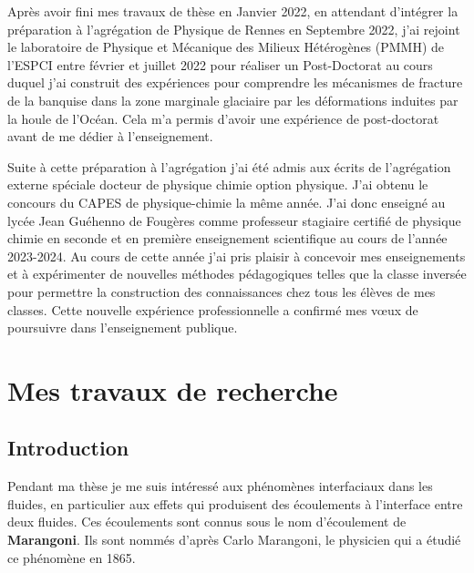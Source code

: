 \documentclass[french, 10pt]{article}
\begin{document}
Après avoir fini mes travaux de thèse en Janvier 2022, en attendant d'intégrer la préparation à l'agrégation de Physique de Rennes en Septembre 2022, j'ai rejoint le laboratoire de Physique et Mécanique des Milieux Hétérogènes (PMMH) de l'ESPCI entre février et juillet 2022 pour réaliser un Post-Doctorat au cours duquel j'ai construit des expériences pour comprendre les mécanismes de fracture de la banquise dans la zone marginale glaciaire par les déformations induites par la houle de l'Océan. Cela m'a permis d'avoir une expérience de post-doctorat avant de me dédier à l'enseignement.\medskip

Suite à cette préparation à l'agrégation j'ai été admis aux écrits de l'agrégation externe spéciale docteur de physique chimie option physique. J'ai obtenu le concours du CAPES de physique-chimie la même année. J'ai donc enseigné au lycée Jean Guéhenno de Fougères comme professeur stagiaire certifié de physique chimie en seconde et en première enseignement scientifique au cours de l'année 2023-2024. Au cours de cette année j'ai pris plaisir à concevoir mes enseignements et à expérimenter de nouvelles méthodes pédagogiques telles que la classe inversée pour permettre la construction des connaissances chez tous les élèves de mes classes. Cette nouvelle expérience professionnelle a confirmé mes v\oe ux de poursuivre dans l'enseignement publique. 

\section{Mes travaux de recherche}
% 
\subsection{Introduction}

Pendant ma thèse je me suis intéressé aux phénomènes interfaciaux dans les fluides, en particulier aux effets qui produisent des écoulements à l'interface entre deux fluides. Ces écoulements sont connus sous le nom d’écoulement de \textbf{Marangoni}. Ils sont nommés d’après Carlo Marangoni, le physicien qui a étudié ce phénomène en 1865.\medskip
\end{document}
